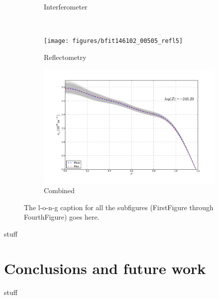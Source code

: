 \documentclass[12pt]{article}
\numberwithin{equation}{section}
\begin{document}
\begin{figure}[ht]
\begin{subfigure}[b]{0.5\textwidth}
		\vspace{-30pt}
		\caption{Interferometer}
		\label{fig:inter505}
	\end{subfigure} \\%
	\begin{subfigure}[b]{0.5\textwidth}
		\centering
		\texttt{[image: figures/bfit146102\_00505\_refl5]}
		\vspace{-30pt}
		\caption{Reflectometry}
		\label{fig:refl505}
	\end{subfigure}
	\hspace{-20pt}
	\begin{subfigure}[b]{0.5\textwidth}
		\centering
		\includegraphics[width=\textwidth,keepaspectratio=true]{figures/bfit146102_00505_all5}
		\vspace{-30pt}
		\caption{Combined}
		\label{fig:all505}
	\end{subfigure}
	\caption{The l-o-n-g caption for all the subfigures (FirstFigure through FourthFigure) goes here.}
	\label{fig:dne505}
\end{figure}
stuff
\section{Conclusions and future work}
stuff
\newpage


\end{document}
